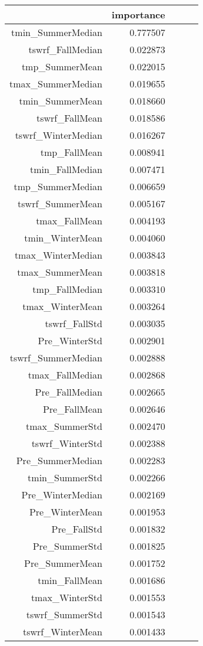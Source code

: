 \begin{tabular}{rrrrr}
\toprule
 & importance \\
\midrule
tmin_SummerMedian & 0.777507 \\
tswrf_FallMedian & 0.022873 \\
tmp_SummerMean & 0.022015 \\
tmax_SummerMedian & 0.019655 \\
tmin_SummerMean & 0.018660 \\
tswrf_FallMean & 0.018586 \\
tswrf_WinterMedian & 0.016267 \\
tmp_FallMean & 0.008941 \\
tmin_FallMedian & 0.007471 \\
tmp_SummerMedian & 0.006659 \\
tswrf_SummerMean & 0.005167 \\
tmax_FallMean & 0.004193 \\
tmin_WinterMean & 0.004060 \\
tmax_WinterMedian & 0.003843 \\
tmax_SummerMean & 0.003818 \\
tmp_FallMedian & 0.003310 \\
tmax_WinterMean & 0.003264 \\
tswrf_FallStd & 0.003035 \\
Pre_WinterStd & 0.002901 \\
tswrf_SummerMedian & 0.002888 \\
tmax_FallMedian & 0.002868 \\
Pre_FallMedian & 0.002665 \\
Pre_FallMean & 0.002646 \\
tmax_SummerStd & 0.002470 \\
tswrf_WinterStd & 0.002388 \\
Pre_SummerMedian & 0.002283 \\
tmin_SummerStd & 0.002266 \\
Pre_WinterMedian & 0.002169 \\
Pre_WinterMean & 0.001953 \\
Pre_FallStd & 0.001832 \\
Pre_SummerStd & 0.001825 \\
Pre_SummerMean & 0.001752 \\
tmin_FallMean & 0.001686 \\
tmax_WinterStd & 0.001553 \\
tswrf_SummerStd & 0.001543 \\
tswrf_WinterMean & 0.001433 \\

\end{tabular}
